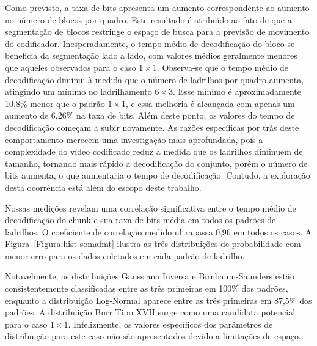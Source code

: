 Como previsto, a taxa de bits apresenta um aumento correspondente ao aumento no número de blocos por quadro. Este resultado é atribuído ao fato de que a segmentação de blocos restringe o espaço de busca para a previsão de movimento do codificador. Inesperadamente, o tempo médio de decodificação do bloco se beneficia da segmentação lado a lado, com valores médios geralmente menores que aqueles observados para o caso $1 \times 1$. Observa-se que o tempo médio de decodificação diminui à medida que o número de ladrilhos por quadro aumenta, atingindo um mínimo no ladrilhamento $6 \times 3$. Esse mínimo é aproximadamente 10,8\% menor que o padrão $1 \times 1$, e essa melhoria é alcançada com apenas um aumento de 6,26\% na taxa de bits. Além deste ponto, os valores do tempo de decodificação começam a subir novamente. As razões específicas por trás deste comportamento merecem uma investigação mais aprofundada, pois a complexidade do vídeo codificado reduz a medida que os ladrilhos diminuem de tamanho, tornando mais rápido a decodificação do conjunto, porém o número de bits aumenta, o que aumentaria o tempo de decodificação. Contudo, a exploração desta ocorrência está além do escopo deste trabalho.


Nossas medições revelam uma correlação significativa entre o tempo médio de decodificação do chunk e sua taxa de bits média em todos os padrões de ladrilhos. O coeficiente de correlação medido ultrapassa 0,96 em todos os casos. A Figura~\ref{Figura:hist-somafmt} ilustra as três distribuições de probabilidade com menor erro para os dados coletados em cada padrão de ladrilho.

Notavelmente, as distribuições Gaussiana Inversa e Birnbaum-Saunders estão consistentemente classificadas entre as três primeiras em 100\% dos padrões, enquanto a distribuição Log-Normal aparece entre as três primeiras em 87,5\% dos padrões. A distribuição Burr Tipo XVII surge como uma candidata potencial para o caso $1 \times 1$. Infelizmente, os valores específicos dos parâmetros de distribuição para este caso não são apresentados devido a limitações de espaço.





